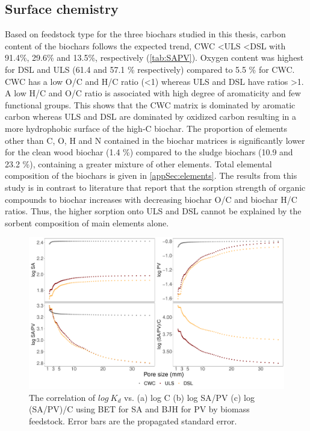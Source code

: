 \subsection{Surface chemistry}
Based on feedstock type for the three biochars studied in this thesis, carbon content of the biochars follows the expected trend, CWC \textless ULS \textless DSL with 91.4\%, 29.6\% and 13.5\%, respectively (\cref{tab:SAPV}). Oxygen content was highest for DSL and ULS (61.4 and 57.1 \% respectively) compared to 5.5 \% for CWC. CWC has a low O/C and H/C ratio (\textless 1) whereas ULS and DSL have ratios \textgreater 1. A low H/C and O/C ratio is associated with high degree of aromaticity and few functional groups. This shows that the CWC matrix is dominated by aromatic carbon whereas ULS and DSL are dominated by oxidized carbon resulting in a more hydrophobic surface of the high-C biochar. The proportion of elements other than C, O, H and N contained in the biochar matrices is significantly lower for the clean wood biochar (1.4 \%) compared to the sludge biochars (10.9 and 23.2 \%), containing a greater mixture of other elements. Total elemental composition of the biochars is given in \cref{appSec:elements}. The results from this study is in contrast to literature \citep{Hale2016,Sormo2021,zhang2021sorption} that report that the sorption strength of organic compounds to biochar increases with decreasing biochar O/C and biochar H/C ratios. Thus, the higher sorption onto ULS and DSL cannot be explained by the sorbent composition of main elements alone.

\begin{figure}
    \centering
    \includegraphics[width=\textwidth]{R/figs/Correlation_SAPV_C_plot.pdf}
    \caption{The correlation of $log~K_d$ vs. (a) log C (b) log SA/PV (c) log (SA/PV)/C using BET for SA and BJH for PV by biomass feedstock. Error bars are the propagated standard error.}
    \label{fig:Kd_SAPV_C}
\end{figure}


